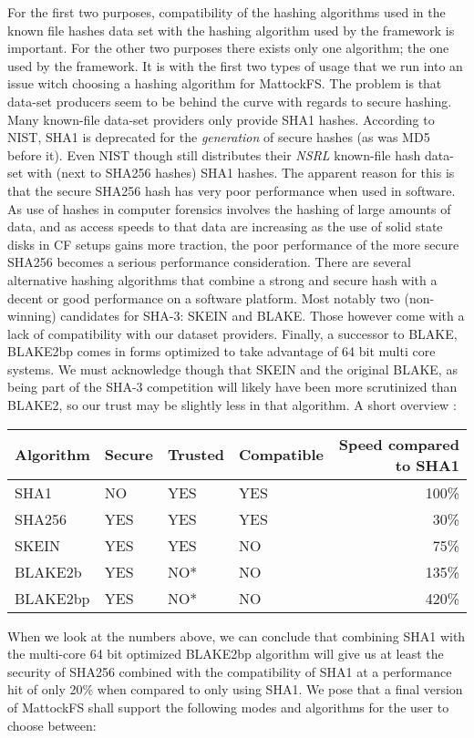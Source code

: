 For the first two purposes, compatibility of the hashing algorithms used in the known file hashes data set with the hashing algorithm used by the framework is important. For the other two purposes there exists only one algorithm; the one used by the framework. It is with the first two types of usage that we run into an issue witch choosing a hashing algorithm for MattockFS. The problem is that data-set producers seem to be behind the curve with regards to secure hashing. Many known-file data-set providers only provide SHA1 hashes. According to NIST, SHA1 is deprecated for the \emph{generation} of secure hashes (as was MD5 before it). Even NIST though still distributes their \emph{NSRL} known-file hash data-set with (next to SHA256 hashes) SHA1 hashes.  The apparent reason for this is that the secure SHA256 hash has very poor performance when used in software. As use of hashes in computer forensics involves the hashing of large amounts of data, and as access speeds to that data are increasing as the use of solid state disks in CF setups gains more traction, the poor performance of the more secure SHA256 becomes a serious performance consideration. There are several alternative hashing algorithms that combine a strong and secure hash with a decent or good performance on a software platform. Most notably two (non-winning) candidates for SHA-3: SKEIN and BLAKE. Those however come with a lack of compatibility with our dataset providers. Finally, a successor to BLAKE, BLAKE2bp comes in forms optimized to take advantage of 64 bit multi core systems. We must acknowledge though that SKEIN and the original BLAKE, as being part of the SHA-3 competition will likely have been more scrutinized than BLAKE2, so our trust may be slightly less in that algorithm. A short overview :
\begin{table}[]
\centering
\begin{tabular}{llllr}
Algorithm & Secure & Trusted & Compatible & Speed compared to SHA1 \\ \hline
SHA1 & NO & YES & YES & 100\% \\
SHA256 & YES & YES & YES & 30\% \\
SKEIN & YES & YES & NO & 75\% \\
BLAKE2b & YES & NO* & NO & 135\% \\
BLAKE2bp & YES & NO* & NO & 420\% \\
\end{tabular}
\end{table}
When we look at the numbers above, we can conclude that combining SHA1 with the multi-core 64 bit optimized BLAKE2bp algorithm will give us at least the security of SHA256 combined with the compatibility of SHA1 at a performance hit of only 20\% when compared to only using SHA1. We pose that a final version of MattockFS shall support the following modes and algorithms for the user to choose between:
